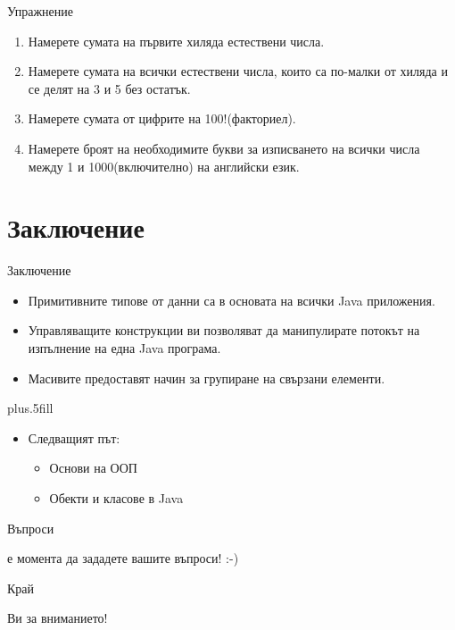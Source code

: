 \documentclass{beamer}
\begin{document}
\begin{frame}{Упражнение}
  \transdissolve  
  \begin{enumerate}
    \item Намерете сумата на първите хиляда естествени числа. \pause
    \item Намерете сумата на всички естествени числа, които са
      по-малки от хиляда и се делят на 3 и 5 без остатък. \pause
    \item Намерете сумата от цифрите на 100!(факториел). \pause
    \item Намерете броят на необходимите букви за изписването на
      всички числа между 1 и 1000(включително) на английски език.
  \end{enumerate}

\end{frame}

\section*{Заключение}

\begin{frame}{Заключение}
  \transdissolve
  \begin{itemize}
  \item
    Примитивните типове от данни са в основата на \alert{всички} Java приложения.
  \item
    Управляващите конструкции ви позволяват да манипулирате потокът на
    изпълнение на една Java програма.
  \item
    Масивите предоставят начин за групиране на свързани елементи.
  \end{itemize}
  
  \vskip0pt plus.5fill
  \begin{itemize}
  \item
    Следващият път:
    \begin{itemize}
    \item
      Основи на ООП
    \item
      Обекти и класове в Java
    \end{itemize}
  \end{itemize}
\end{frame}


\begin{frame}{Въпроси}
  \transdissolve
  \begin{center}
     е момента да зададете вашите въпроси! :-)
  \end{center}
\end{frame}


\begin{frame}{Край}
  \transdissolve
  \begin{center}
     Ви за вниманието!
  \end{center}
  
\end{frame}
\end{document}
